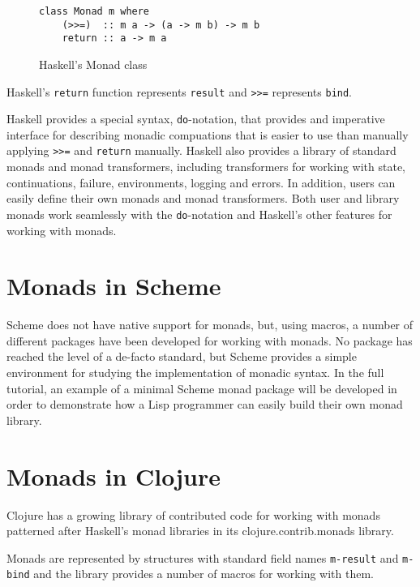 \documentclass[natbib,10pt]{sigplanconf}
\begin{document}
\begin{figure}
\begin{center}
\begin{verbatim}
class Monad m where
    (>>=)  :: m a -> (a -> m b) -> m b
    return :: a -> m a
\end{verbatim}
\end{center}
\caption{Haskell's Monad class}
\label{fig-Haskell-Monad-class}
\end{figure}

Haskell's {\tt return} function represents {\tt result} and {\tt >>=}
represents {\tt bind}.

Haskell provides a special syntax, {\tt do}-notation, that provides
and imperative interface for describing monadic compuations that is 
easier to use than manually applying {\tt >>=} and {\tt return} 
manually. Haskell also provides a library of standard monads and 
monad transformers, including transformers for working with state, 
continuations, failure, environments, logging and errors.  In addition, 
users can easily define their own monads and monad transformers. Both
user and library monads work seamlessly with the {\tt do}-notation and
Haskell's other features for working with monads.

\section{Monads in Scheme}

Scheme does not have native support for monads, but, using macros,
a number of different packages have been developed for working 
with monads.  No package has reached the level of a de-facto standard, 
but Scheme provides a simple environment for studying the implementation
of monadic syntax. In the full tutorial, an example of a minimal Scheme 
monad package will be developed in order to demonstrate how a Lisp 
programmer can easily build their own monad library.

\section{Monads in Clojure}

Clojure has a growing library of contributed code for working with
monads patterned after Haskell's monad libraries in its
clojure.contrib.monads library.

Monads are represented by structures with standard field names
{\tt m-result} and {\tt m-bind} and the library provides a number of
macros for working with them.
\end{document}
